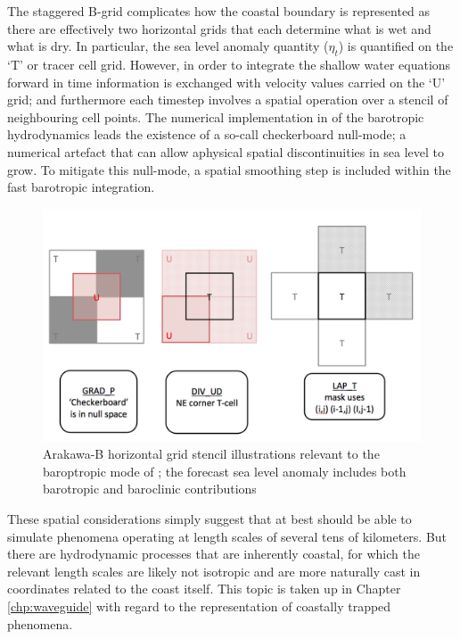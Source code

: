 The staggered B-grid complicates how the coastal boundary is represented as there are effectively two horizontal grids that each determine what is wet and what is dry.
In particular, the sea level anomaly quantity ($\eta_t$) is quantified on the `T' or tracer cell grid.    However, in order to integrate the shallow water equations forward in time information is exchanged with velocity values carried on the `U' grid; and furthermore each timestep involves a spatial operation over a stencil of neighbouring cell points. 
The numerical implementation in \BL{} of the barotropic hydrodynamics leads the existence of a so-call checkerboard null-mode; a numerical artefact that can allow aphysical spatial discontinuities in sea level to grow.   To mitigate this null-mode, a spatial smoothing step is included within the fast barotropic integration.
\begin{figure}[H]
    \begin{center}
    \includegraphics[width=\figwidthBig]{figures/diagrams/mom_BT_stencils_extra.png}
    \caption{Arakawa-B horizontal grid stencil illustrations relevant to the baroptropic mode of \BL{}; the forecast sea level anomaly includes both barotropic and baroclinic contributions}
    \end{center}
    \label{fig:atlas}
\end{figure}
These spatial considerations simply suggest that at best \BL{} should be able to simulate phenomena operating at length scales of several tens of kilometers.
But there are hydrodynamic processes that are inherently coastal, for which the relevant length scales are likely not isotropic and are more naturally cast in coordinates related to the coast itself.    
This topic is taken up in Chapter \ref{chp:waveguide} with regard to the representation of coastally trapped phenomena.





